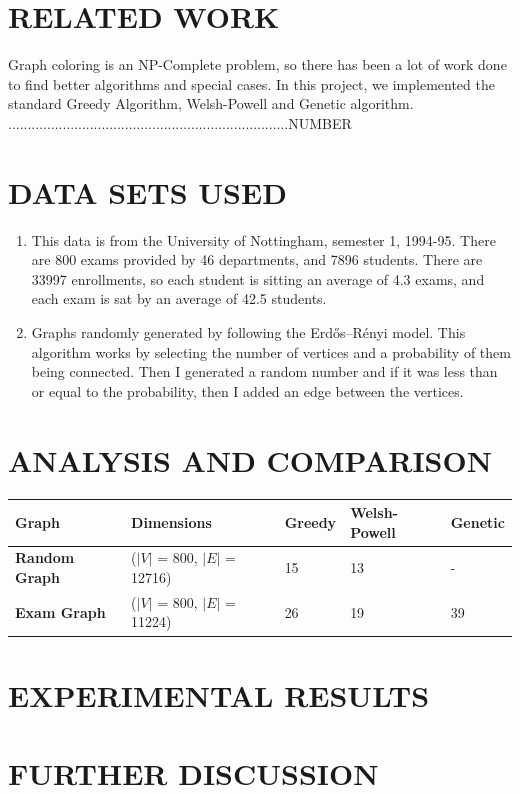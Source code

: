 \documentclass[12]{article}
\begin{document}
\section{RELATED WORK}
Graph coloring is an NP-Complete problem, so there has been a lot of work done to find better algorithms and special cases. In this project,  we implemented the standard Greedy Algorithm, Welsh-Powell and Genetic algorithm. ........................................................................NUMBER
\section{DATA SETS USED}
\begin{enumerate}
\item This data is from the University of Nottingham, semester 1, 1994-95. There are 800 exams provided by 46 departments, and 7896 students. There are 33997 enrollments, so each student is sitting an average of 4.3 exams, and each exam is sat by an average of 42.5 students.

\item Graphs randomly generated by following the Erdős–Rényi model. This algorithm works by selecting the number of vertices and a probability of them being connected. Then I generated a random number and if it was less than or equal to the probability, then I added an edge between the vertices.
\end{enumerate}
\section{ANALYSIS AND COMPARISON}
\begin{table}[H]
\centering
\begin{tabular}{|l|l|l|l|l|}
\hline
  Graph & Dimensions & \bf{Greedy}  & \bf{Welsh-Powell} &  \bf{Genetic}  \\ \hline
\bf{Random Graph}  &($|V|$ = 800, $|E|$ = 12716)  & 15  & 13 &  -  \\ \hline
 \bf{Exam Graph}  &($|V|$ = 800, $|E|$ = 11224) & 26  & 19 &  39  \\ \hline
\end{tabular}
\end{table}
\section{EXPERIMENTAL RESULTS}

\section{FURTHER DISCUSSION}
\end{document}
